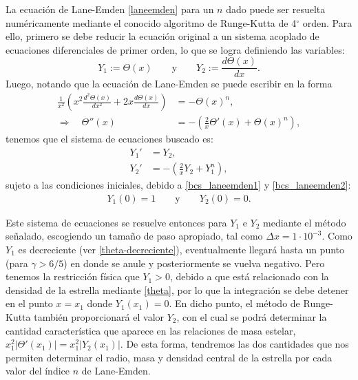 La ecuación de Lane-Emden \eqref{laneemden} para un $n$ dado puede ser resuelta  numéricamente mediante el conocido algoritmo de Runge-Kutta de 4${}^{\circ}$ orden. Para ello, primero se debe reducir la ecuación original a un sistema acoplado de ecuaciones diferenciales de primer orden, lo que se logra definiendo las variables:
\begin{equation}
Y_1:=\Theta(x)\qquad\text{y}\qquad Y_2:=\frac{d\Theta(x)}{dx}.
\end{equation}
Luego, notando que la ecuación de Lane-Emden se puede escribir en la forma
\begin{align}
 \frac{1}{x^2}\left(x^2\frac{d^2\Theta(x)}{dx^2}+2x\frac{d\Theta(x)}{dx}\right)&=-\Theta(x)^n,\\
\Rightarrow\quad \Theta''(x)&=-\left(\frac{2}{x}\Theta'(x)+\Theta(x)^n\right),
\end{align}
tenemos que el sistema de ecuaciones buscado es:
\begin{equation}
\boxed{
\begin{aligned}
 Y_1'&=Y_2,\\
Y_2'&=-\left(\frac{2}{x}Y_2+Y_1^n\right),
\end{aligned}}
\end{equation}
sujeto a las condiciones iniciales, debido a \eqref{bcs_laneemden1} y \eqref{bcs_laneemden2}:
\begin{align}
 Y_1(0)=1\qquad\text{y}\qquad Y_2(0)=0.
\end{align}

Este sistema de ecuaciones se resuelve entonces para $Y_1$ e $Y_2$ mediante el método se\~nalado, escogiendo un tama\~no de paso apropiado, tal como $\Delta x=1\cdot10^{-3}$. Como $Y_1$ es decreciente (ver \eqref{theta-decreciente}), eventualmente llegará hasta un punto (para $\gamma>6/5$) en donde se anule y posteriormente se vuelva negativo. Pero tenemos la restricción física que $Y_1>0$, debido a que está relacionado con la densidad de la estrella mediante \eqref{theta}, por lo que la integración se debe detener en el punto $x=x_1$ donde $Y_1(x_1)=0$. En dicho punto, el método de Runge-Kutta también proporcionará el valor $Y_2$, con el cual se podrá determinar la cantidad característica que aparece en las relaciones de masa estelar, $x_1^2\left|\Theta'(x_1)\right|=x_1^2\left|Y_2(x_1)\right|$. De esta forma, tendremos las dos cantidades que nos permiten determinar el radio, masa y densidad central de la estrella por cada valor del índice $n$ de Lane-Emden.

